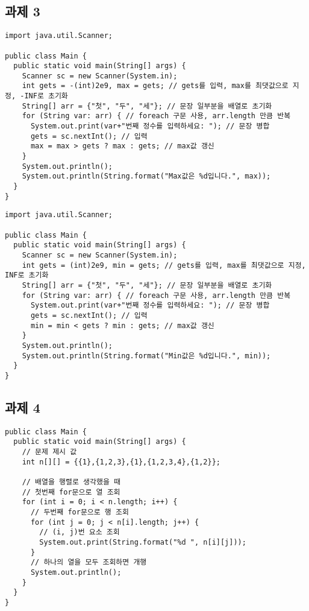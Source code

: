 \documentclass{article}
\begin{document}
\subsection{과제 3}
\begin{lstlisting}
import java.util.Scanner;

public class Main {
  public static void main(String[] args) {
    Scanner sc = new Scanner(System.in);
    int gets = -(int)2e9, max = gets; // gets를 입력, max를 최댓값으로 지정, -INF로 초기화
    String[] arr = {"첫", "두", "세"}; // 문장 일부분을 배열로 초기화
    for (String var: arr) { // foreach 구문 사용, arr.length 만큼 반복
      System.out.print(var+"번째 정수를 입력하세요: "); // 문장 병합
      gets = sc.nextInt(); // 입력
      max = max > gets ? max : gets; // max값 갱신
    }
    System.out.println();
    System.out.println(String.format("Max값은 %d입니다.", max));
  }
}
\end{lstlisting}
\begin{lstlisting}
import java.util.Scanner;

public class Main {
  public static void main(String[] args) {
    Scanner sc = new Scanner(System.in);
    int gets = (int)2e9, min = gets; // gets를 입력, max를 최댓값으로 지정, INF로 초기화
    String[] arr = {"첫", "두", "세"}; // 문장 일부분을 배열로 초기화
    for (String var: arr) { // foreach 구문 사용, arr.length 만큼 반복
      System.out.print(var+"번째 정수를 입력하세요: "); // 문장 병합
      gets = sc.nextInt(); // 입력
      min = min < gets ? min : gets; // max값 갱신
    }
    System.out.println();
    System.out.println(String.format("Min값은 %d입니다.", min));
  }
}
\end{lstlisting}
\subsection{과제 4}
\begin{lstlisting}
public class Main {
  public static void main(String[] args) {
    // 문제 제시 값
    int n[][] = {{1},{1,2,3},{1},{1,2,3,4},{1,2}};

    // 배열을 행렬로 생각했을 때
    // 첫번째 for문으로 열 조회
    for (int i = 0; i < n.length; i++) {
      // 두번째 for문으로 행 조회
      for (int j = 0; j < n[i].length; j++) {
        // (i, j)번 요소 조회
        System.out.print(String.format("%d ", n[i][j]));
      }
      // 하나의 열을 모두 조회하면 개행
      System.out.println();
    }
  }
}
\end{lstlisting}
\end{document}
